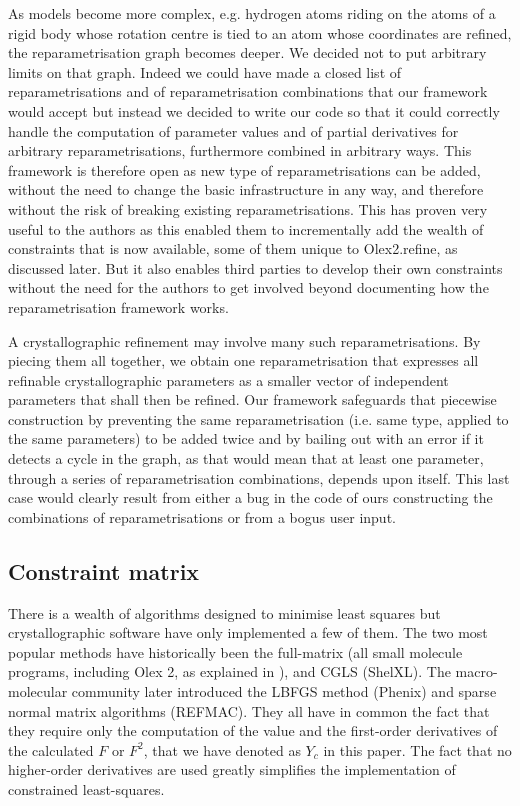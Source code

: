 \documentclass[pdf]{iucr}
\begin{document}
As models become more complex, e.g. hydrogen atoms riding on the atoms of a rigid body whose rotation centre is tied to an atom whose coordinates are refined, the reparametrisation graph becomes deeper. We decided not to put arbitrary limits on that graph. Indeed we could have made a closed list of reparametrisations and of reparametrisation combinations  that our framework would accept but instead we decided to write our code so that it could correctly handle the computation of parameter values and of partial derivatives for arbitrary reparametrisations, furthermore combined in arbitrary ways. This framework is therefore open as new type of reparametrisations can be added, without the need to change the basic infrastructure in any way, and therefore without the risk of breaking existing reparametrisations. This has proven very useful to the authors as this enabled them to incrementally add the wealth of constraints that is now available, some of them unique to Olex2.refine, as discussed later. But it also enables third parties to develop their own constraints without the need for the authors to get involved beyond documenting how the reparametrisation framework works.

A crystallographic refinement may involve many such reparametrisations. By piecing them all together, we obtain one reparametrisation that expresses all refinable crystallographic parameters as a smaller vector of independent parameters that shall then be refined. Our framework safeguards that piecewise construction by preventing the same reparametrisation (i.e. same type, applied to the same parameters) to be added twice and by bailing out with an error if it detects a cycle in the graph, as that would mean that at least one parameter, through a series of reparametrisation combinations, depends upon itself. This last case would clearly result from either a bug in the code of ours constructing the combinations of reparametrisations or from a bogus user input.

\subsection{Constraint matrix}

There is a wealth of algorithms designed to minimise least squares but crystallographic software have only implemented a few of them. The two most popular methods have historically been the full-matrix (all small molecule programs, including Olex 2, as explained in ), and CGLS (ShelXL).  The macro-molecular community later introduced the LBFGS method (Phenix) and sparse normal matrix algorithms (REFMAC). They all have in common the fact that they require  only the computation of the value and the first-order derivatives of the calculated $F$ or $F^2$, that we have denoted as $Y_c$ in this paper. The fact that no higher-order derivatives are used greatly simplifies the implementation of constrained least-squares.
\end{document}
